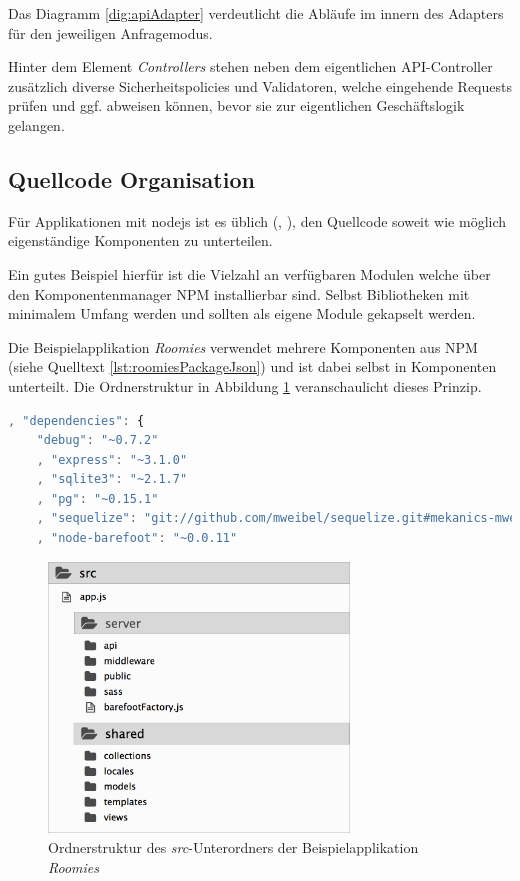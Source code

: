 Das Diagramm \ref{dig:apiAdapter} verdeutlicht die Abläufe im innern des Adapters für den jeweiligen Anfragemodus.

Hinter dem Element \emph{Controllers} stehen neben dem eigentlichen API-Controller zusätzlich diverse Sicherheitspolicies und Validatoren, welche eingehende Requests prüfen und ggf. abweisen können, bevor sie zur eigentlichen Geschäftslogik gelangen.



\newpage

\subsection{Quellcode Organisation}
Für Applikationen mit \gls{nodejs} ist es üblich (\cite{TJH_ComponentStructure}, \cite{IZS_ComponentStructure}), den Quellcode soweit wie möglich eigenständige Komponenten zu unterteilen.

Ein gutes Beispiel hierfür ist die Vielzahl an verfügbaren Modulen welche über den Komponentenmanager NPM \cite{NPM} installierbar sind. Selbst Bibliotheken mit minimalem Umfang werden und sollten als eigene Module gekapselt werden.

Die Beispielapplikation \emph{Roomies} verwendet mehrere Komponenten aus NPM (siehe Quelltext \ref{lst:roomiesPackageJson}) und ist dabei selbst in Komponenten unterteilt. Die Ordnerstruktur in Abbildung \ref{fig:roomiesFolderStructure} veranschaulicht dieses Prinzip.

\begin{lstlisting}[language=JavaScript, firstnumber=9, caption={Auszug der verwendeten NPM Komponenten \cite{RoomiesPackageJson}}, label={lst:roomiesPackageJson}, float=ht!]
, "dependencies": {
	"debug": "~0.7.2"
	, "express": "~3.1.0"
	, "sqlite3": "~2.1.7"
	, "pg": "~0.15.1"
	, "sequelize": "git://github.com/mweibel/sequelize.git#mekanics-mweibel-fix"
	, "node-barefoot": "~0.0.11"
\end{lstlisting}

\begin{figure}[H]
	\centering
	\includegraphics[width=8cm]{content/sad/images/folder-structure.png}
	\caption{Ordnerstruktur des \emph{src}-Unterordners der Beispielapplikation \emph{Roomies}}
	\label{fig:roomiesFolderStructure}
\end{figure}

